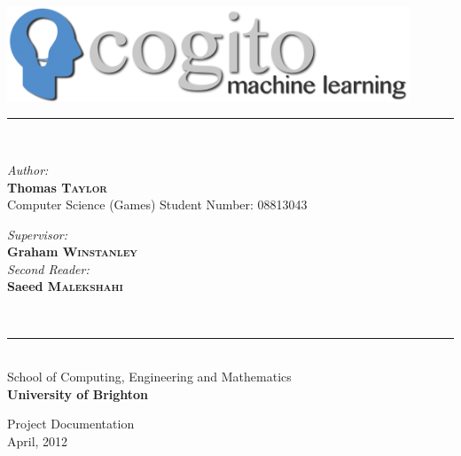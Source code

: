 \documentclass[a4paper,oneside]{report}
\newcommand{\HRuleLight}{\rule{\linewidth}{0.1mm}}
\begin{document}
%
%
\begin{titlepage}
\begin{center}

\includegraphics[width=120mm]{sources/images/cogito_logo_main.png}

\HRuleLight\\[0.5cm]

\begin{minipage}{0.45\textwidth}
	\begin{flushleft}\large
		\emph{Author:}\\
			\textbf{Thomas \textsc{Taylor}}\\[0.27cm]
			Computer Science (Games)
			Student Number: 08813043
	\end{flushleft}
\end{minipage}
\begin{minipage}{0.43\textwidth}
	\begin{flushright} \large
		\emph{Supervisor:} \\
		\textbf{Graham \textsc{Winstanley}}\\[0.25cm]
		\emph{Second Reader:}\\
		\textbf{Saeed \textsc{Malekshahi}}
	\end{flushright}
\end{minipage}\\[0.75cm] 

\HRuleLight\\[0.2cm]

\large School of Computing, Engineering and Mathematics\\ \textbf{University of Brighton}

\vfill
\huge Project Documentation\\
\large April, 2012\\

\end{center}
\end{titlepage}



%
%
{
	\renewcommand\thepage{}
	\setcounter{tocdepth}{1}
	\tableofcontents
	\clearpage
}

\setcounter{page}{1}
\end{document}
